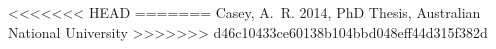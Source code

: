 \documentclass[a4paper,fleqn,usenatbib]{mnras}
\begin{document}
\begin{thebibliography}{99}
<<<<<<< HEAD
=======
Casey, A.~R. 2014, 
PhD Thesis, Australian National University
>>>>>>> d46c10433ce60138b104bbd048eff44d315f382d

\end{thebibliography}


\bsp	%
\label{lastpage}
\end{document}
